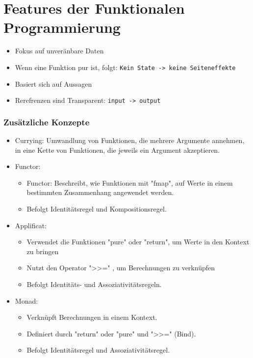 \documentclass{beamer}
\def\code#1{\texttt{#1}}
\begin{document}
\section{Features der Funktionalen Programmierung}
\begin{frame}
	\begin{itemize}
		\item Fokus auf unveränbare Daten
            \item Wenn eine Funktion pur ist, folgt: \code{Kein State -> keine Seiteneffekte}
            \item Basiert sich auf Aussagen
            \item Rerefrenzen sind Transparent:   \code{input -> output}
	\end{itemize}
\end{frame}


\begin{frame}
\frametitle{Zusätzliche Konzepte }
	\begin{itemize}
			\item Currying: Umwandlung von Funktionen, die mehrere Argumente annehmen, in eine Kette von Funktionen, die jeweils ein Argument akzeptieren.
			\item Functor: \begin{itemize}
			    \item Functor: Beschreibt, wie Funktionen mit "fmap",  auf Werte in einem bestimmten Zusammenhang angewendet werden.
                    \item  Befolgt Identitätsregel und Kompositionsregel.
			\end{itemize}  
                \item Applificat: \begin{itemize}
                    \item Verwendet die Funktionen   "pure" oder "return", um Werte in den Kontext zu bringen
                    \item Nutzt den Operator ">>=" , um Berechnungen zu verknüpfen
                    \item Befolgt Identitäts- und Assoziativitätsregeln.
                \end{itemize} 
                \item Monad: \begin{itemize}
                    \item Verknüpft Berechnungen in einem Kontext.
                    \item Definiert durch "return" oder "pure" und ">>=" (Bind).
                    \item Befolgt Identitätsregel und Assoziativitätsregel.
                \end{itemize}  
	\end{itemize}
    
\end{frame}
\end{document}
